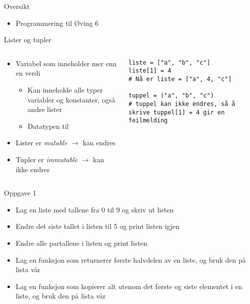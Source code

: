 \documentclass[screen, aspectratio=169]{beamer}
\begin{document}
\begin{frame}{Oversikt}
	\begin{itemize}
		\item Programmering til Øving 6
	\end{itemize}
\end{frame}

\begin{frame}[fragile]{Lister og tupler}
	\begin{columns}
		\begin{column}{.6\textwidth}
			\begin{itemize}
				\item Variabel som inneholder mer enn en verdi
				\begin{itemize}
					\item Kan inneholde alle typer variabler og konstanter, også andre lister
					\item Datatypen til 
				\end{itemize}
				\item Lister er \emph{mutable} $\rightarrow$ kan endres
				\item Tupler er \emph{immutable} $\rightarrow$ kan ikke endres
			\end{itemize}
		\end{column}
		\begin{column}{.4\textwidth}
			\begin{lstlisting}
liste = ["a", "b", "c"]
liste[1] = 4
# Nå er liste = ["a", 4, "c"]

tuppel = ("a", "b", "c")
# tuppel kan ikke endres, så å skrive tuppel[1] = 4 gir en feilmelding
			\end{lstlisting}
		\end{column}
	\end{columns}
\end{frame}

\begin{frame}{Oppgave 1}
	\begin{itemize}
		\item<+-> Lag en liste med tallene fra 0 til 9 og skriv ut listen
		\item<+-> Endre det siste tallet i listen til 5 og print listen igjen
		\item<+-> Endre alle partallene i listen og print listen
		\item<+-> Lag en funksjon som returnerer første halvdelen av en liste, og bruk den på lista vår
		\item<+-> Lag en funksjon som kopierer alt utenom det første og siste elementet i en liste, og bruk den på lista vår
	\end{itemize}
\end{frame}
\end{document}
